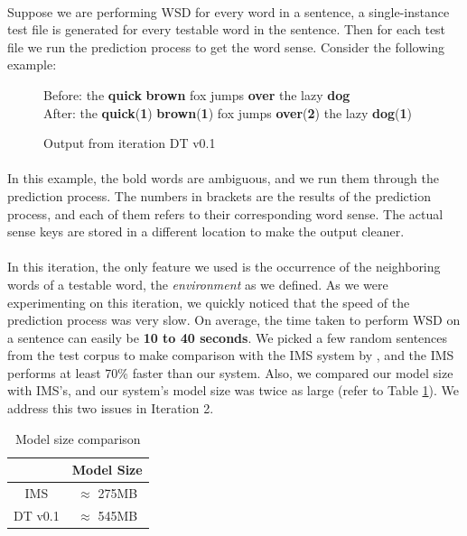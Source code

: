 \paragraph{}
Suppose we are performing WSD for every word in a sentence, a single-instance test file is generated for every testable word in the sentence. Then for each test file we run the prediction process to get the word sense. Consider the following example: \\

\begin{figure}[h]
\center
Before: the \textbf{quick} \textbf{brown} fox jumps \textbf{over} the lazy \textbf{dog} \\
\hspace{18 mm}After: the \textbf{quick}(\textbf{1}) \textbf{brown}(\textbf{1}) fox jumps \textbf{over}(\textbf{2}) the lazy \textbf{dog}(\textbf{1})
\caption{Output from iteration DT v0.1}
\end{figure}

\paragraph{}
In this example, the bold words are ambiguous, and we run them through the prediction process. The numbers in brackets are the results of the prediction process, and each of them refers to their corresponding word sense. The actual sense keys are stored in a different location to make the output cleaner.

\paragraph{}
In this iteration, the only feature we used is the occurrence of the neighboring words of a testable word, the \textit{environment} as we defined. As we were experimenting on this iteration, we quickly noticed that the speed of the prediction process was very slow. On average, the time taken to perform WSD on a sentence can easily be \textbf{10 to 40 seconds}. We picked a few random sentences from the test corpus to make comparison with the IMS system by \cite{itmakessense}, and the IMS performs at least 70\% faster than our system. Also, we compared our model size with IMS's, and our system's model size was twice as large (refer to Table \ref{tab:modelSize}). We address this two issues in Iteration 2.

\begin{table}[h]
	\center
	\begin{tabular}{| c | c |}
		\hline
		& Model Size \\
		\hline
		IMS & $\approx$ 275MB \\
		\hline
		DT v0.1 & $\approx$ 545MB \\
		\hline
	\end{tabular}
	\caption{Model size comparison}
	\label{tab:modelSize}
\end{table}


